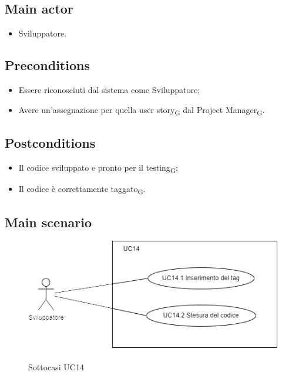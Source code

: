 \documentclass{article}
\begin{document}
    \subsection*{Main actor}
        \begin{itemize}
            \item Sviluppatore.
        \end{itemize}
    
    \subsection*{Preconditions}
        \begin{itemize}
            \item Essere riconosciuti dal sistema come Sviluppatore;
            \item Avere un'assegnazione per quella user story\textsubscript{G} dal Project Manager\textsubscript{G}.
        \end{itemize}
        
    \subsection*{Postconditions} 
        \begin{itemize}
            \item Il codice sviluppato e pronto per il testing\textsubscript{G};
            \item Il codice è correttamente taggato\textsubscript{G}.
        \end{itemize}
    
    \subsection*{Main scenario}
        \begin{figure}[h]
          \centering
          \includegraphics{./imgUML/UC14-zoom.png}
          \caption{Sottocasi UC14}
          \label{fig:UC14_sottocasi}
        \end{figure}
        
\end{document}
